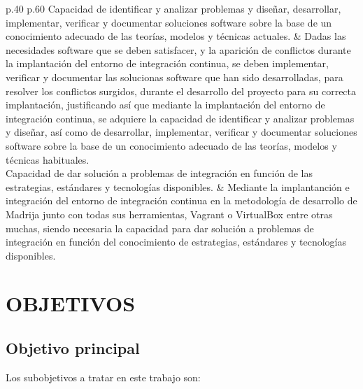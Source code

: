 \documentclass{pre-tfg}
\begin{document}
\begin{center}
\begin{longtable}{p{.40\textwidth} p{.60\textwidth}}
    \hline \hline
    Capacidad de identificar y analizar problemas y diseñar, desarrollar, implementar, verificar y documentar soluciones software sobre la base de un conocimiento adecuado de las teorías, modelos y técnicas actuales. & Dadas las necesidades software que se deben satisfacer,  y la aparición de conflictos durante la implantación del entorno de integración continua, se deben implementar, verificar y documentar las solucionas software que han sido desarrolladas, para resolver los conflictos surgidos, durante el desarrollo del proyecto para su correcta implantación, justificando así que mediante la implantación del entorno de integración continua, se adquiere la capacidad de identificar y analizar problemas y diseñar, así como de desarrollar, implementar, verificar y documentar soluciones software sobre la base de un conocimiento adecuado de las teorías, modelos y técnicas habituales.\\
    \hline \hline
    Capacidad de dar solución a problemas de integración en función de las estrategias, estándares y tecnologías disponibles. & Mediante la implantanción e integración del entorno de integración continua en la metodología de desarrollo de Madrija junto con todas sus herramientas, Vagrant o VirtualBox\cite{VirtualBox} entre otras muchas, siendo necesaria la capacidad para dar solución a problemas de integración en función del conocimiento de estrategias, estándares y tecnologías disponibles.\\
    \hline \hline
\caption{Justificación de las competencias específicas abordadas en el TFG}
\end{longtable}
\end{center}

\section{OBJETIVOS}

\subsection{Objetivo principal}


Los subobjetivos a tratar en este trabajo son:
\end{document}
